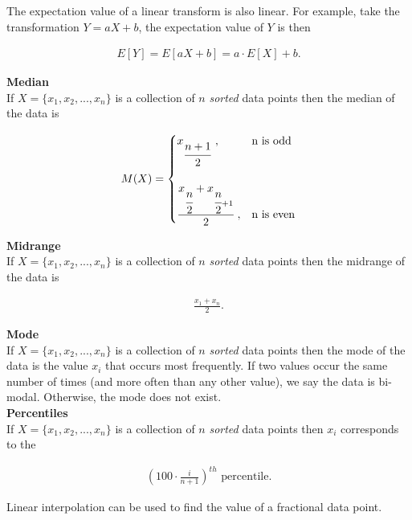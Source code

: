 \documentclass{article}
\numberwithin{theorem}{subsection}
\numberwithin{theorem}{subsubsection}
\theoremstyle{definition}
\numberwithin{definition}{subsection}
\numberwithin{definition}{subsubsection}
\begin{document}
The expectation value of a linear transform is also linear. For example, take the transformation $Y = aX + b$, the expectation value of $Y$ is then

\begin{gather*}
   E[Y] = E[aX + b] = a\cdot E[X] + b. 
\end{gather*}

\noindent \textbf{Median}\\
\indent If $X = \{x_{1},x_{2},...,x_{n}\}$ is a collection of $n$ \textit{sorted} data points then the median of the data is

\begin{gather*}
    M(X) =  \begin{cases} 
                      x_{\cfrac{n+1}{2}}\ , & $n$ \text{ is odd}\\\\
                      \cfrac{x_{\cfrac{n}{2}} + x_{\cfrac{n}{2} + 1}}{2}\ , & $n$ \text{ is even}
                   \end{cases}
\end{gather*}

\noindent \textbf{Midrange} \\
\indent If $X = \{x_{1},x_{2},...,x_{n}\}$ is a collection of $n$ \textit{sorted} data points then the midrange of the data is

\begin{gather*}
    \frac{x_{1} + x_{n}}{2}.
\end{gather*}

\noindent \textbf{Mode} \\
\indent If $X = \{x_{1},x_{2},...,x_{n}\}$ is a collection of $n$ \textit{sorted} data points then the mode of the data is the value $x_{i}$ that occurs most frequently. If two values occur the same number of times (and more often than any other value), we say the data is bi-modal. Otherwise, the mode does not exist.
\\

\noindent \textbf{Percentiles} \\
\indent If $X = \{x_{1},x_{2},...,x_{n}\}$ is a collection of $n$ \textit{sorted} data points then $x_{i}$ corresponds to the

\begin{gather*}
    \left ( 100 \cdot \frac{i}{n+1}\right )^{th} \text{ percentile}.
\end{gather*}

\indent Linear interpolation can be used to find the value of a fractional data point.\\
\end{document}
